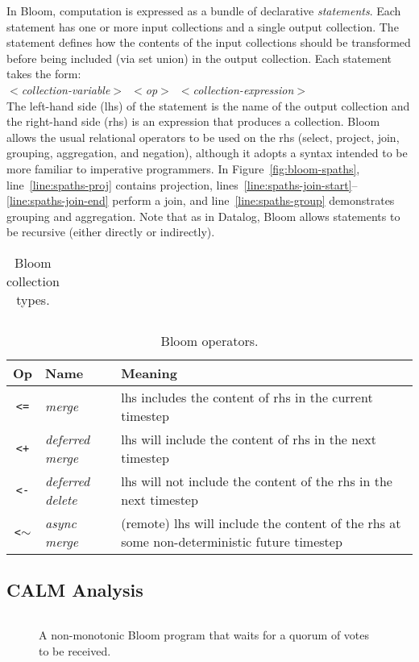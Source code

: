 In Bloom, computation is expressed as a bundle of declarative
\emph{statements}. Each statement has one or more input collections and a single
output collection. The statement defines how the contents of the input
collections should be transformed before being included (via set union) in the
output collection. Each statement takes the form: \\ \noindent
\mbox{\hspace{0.25in}\emph{$<$collection-variable$>$ $<$op$>$
    $<$collection-expression$>$}}\\ \noindent
The left-hand side (lhs) of the statement is the name of the output collection
and the right-hand side (rhs) is an expression that produces a collection. Bloom
allows the usual relational operators to be used on the rhs (select, project,
join, grouping, aggregation, and negation), although it adopts a syntax intended
to be more familiar to imperative programmers. In Figure~\ref{fig:bloom-spaths},
line~\ref{line:spaths-proj} contains projection,
lines~\ref{line:spaths-join-start}--\ref{line:spaths-join-end} perform a join,
and line~\ref{line:spaths-group} demonstrates grouping and aggregation. Note
that as in Datalog, Bloom allows statements to be recursive (either directly or
indirectly). %

\begin{table}
\begin{tabular}{|c|l|}
\end{tabular}
\caption{Bloom collection types.}
\label{tbl:bloom-collections}
\end{table}

\begin{table}
\begin{tabular}{|c|l|p{1.85in}|}
\hline
\textbf{Op} & \textbf{Name} & \textbf{Meaning} \\
\hline
\verb|<=| & \emph{merge} & lhs includes the content of rhs in the
current timestep \\
\hline
\verb|<+| & \emph{deferred merge} & lhs will include the content of rhs in the
next timestep \\
\hline
\verb|<-| & \emph{deferred delete} & lhs will not include the content of the rhs
in the next timestep \\
\hline
\verb|<|$\sim$ & \emph{async merge} & (remote) lhs will include the content of the
rhs at some non-deterministic future timestep\\
\hline
\end{tabular}
\caption{Bloom operators.}
\label{tbl:bloom-ops}
\end{table}

\subsection{CALM Analysis}
\label{sec:bg-calm}

\begin{figure}[t]
\begin{scriptsize}
\begin{lstlisting}
\end{lstlisting}
\end{scriptsize}
\caption{A non-monotonic Bloom program that waits for a quorum of votes to be received.}
\label{fig:bloom-nm-quorum}
\end{figure}
